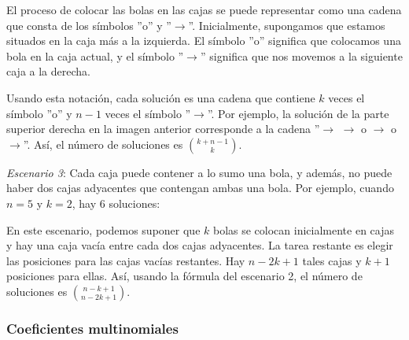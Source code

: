 El proceso de colocar las bolas en las cajas
se puede representar como una cadena
que consta de los símbolos
''o'' y ''$\rightarrow$''.
Inicialmente, supongamos que estamos situados en la caja más a la izquierda.
El símbolo ''o'' significa que colocamos una bola
en la caja actual, y el símbolo
''$\rightarrow$'' significa que nos movemos a
la siguiente caja a la derecha.

Usando esta notación, cada solución es una cadena
que contiene $k$ veces el símbolo ''o'' y
$n-1$ veces el símbolo ''$\rightarrow$''.
Por ejemplo, la solución de la parte superior derecha
en la imagen anterior corresponde a la cadena
''$\rightarrow$ $\rightarrow$ o $\rightarrow$ o $\rightarrow$''.
Así, el número de soluciones es
${k+n-1 \choose k}$.

\textit{Escenario 3}: Cada caja puede contener a lo sumo una bola,
y además, no puede haber dos cajas adyacentes que contengan ambas una bola.
Por ejemplo, cuando $n=5$ y $k=2$,
hay 6 soluciones:


\begin{center}
\end{center}

En este escenario, podemos suponer que
$k$ bolas se colocan inicialmente en cajas
y hay una caja vacía entre cada
dos cajas adyacentes.
La tarea restante es elegir las
posiciones para las cajas vacías restantes.
Hay $n-2k+1$ tales cajas y
$k+1$ posiciones para ellas.
Así, usando la fórmula del escenario 2,
el número de soluciones es
${n-k+1 \choose n-2k+1}$.

\subsubsection{Coeficientes multinomiales}

